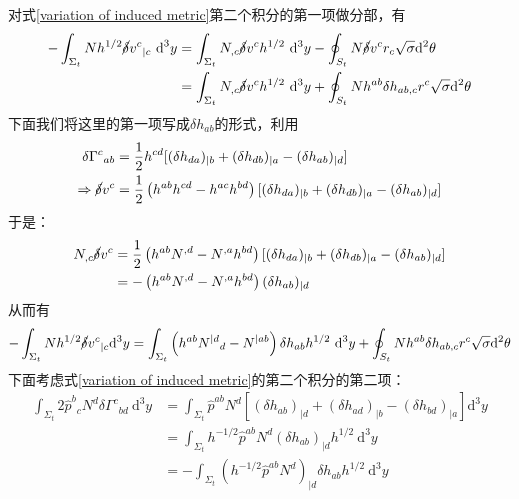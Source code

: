 \documentclass[hyperref, UTF8, a4paper]{ctexart}
\begin{document}
对式\ref{variation of induced metric}第二个积分的第一项做分部，有
\begin{equation*}
	\begin{aligned}
		-\int _{\Sigma _{t}} Nh^{1/2}\cancel{\delta } v^{c}{}_{|c}\mathrm{\ d}^{3} y & =\int _{\Sigma _{t}} N_{,c}\cancel{\delta } v^{c} h^{1/2} \ \mathrm{d}^{3} y-\oint _{S_{t}} N\cancel{\delta } v^{c} r_{c}\sqrt{\sigma }\mathrm{d}^{2} \theta \\
		& =\int _{\Sigma _{t}} N_{,c}\cancel{\delta } v^{c} h^{1/2} \ \mathrm{d}^{3} y+\oint _{S_{t}} Nh^{ab} \delta h_{ab,c} r^{c}\sqrt{\sigma }\mathrm{d}^{2} \theta 
	\end{aligned}
\end{equation*}
下面我们将这里的第一项写成$\delta h_{ab}$的形式，利用
\begin{equation*}
	\begin{aligned}
		\delta \Gamma ^{c}{}_{ab} & =\frac{1}{2} h^{cd}[( \delta h_{da})_{\mid b} +( \delta h_{db})_{\mid a} -( \delta h_{ab})_{\mid d}]\\
		\Rightarrow \cancel{\delta } v^{c} & =\frac{1}{2}\left( h^{ab} h^{cd} -h^{ac} h^{bd}\right)[( \delta h_{da})_{\mid b} +( \delta h_{db})_{\mid a} -( \delta h_{ab})_{\mid d}]
	\end{aligned}
\end{equation*}
于是：
\begin{equation*}
	\begin{aligned}
		N_{,c}\cancel{\delta } v^{c} & =\frac{1}{2}\left( h^{ab} N^{,d} -N^{,a} h^{bd}\right)[( \delta h_{da})_{\mid b} +( \delta h_{db})_{\mid a} -( \delta h_{ab})_{\mid d}]\\
		& =-\left( h^{ab} N^{,d} -N^{,a} h^{bd}\right)( \delta h_{ab})_{\mid d}
	\end{aligned}
\end{equation*}
从而有
\begin{equation*}
	-\int _{\Sigma _{t}} Nh^{1/2}\cancel{\delta } v^{c}{}_{|c}\mathrm{d}^{3} y=\int _{\Sigma _{t}}\left( h^{ab} N^{\mid d}{}_{d} -N^{\mid ab}\right) \delta h_{ab} h^{1/2} \ \mathrm{d}^{3} y+\oint _{S_{t}} Nh^{ab} \delta h_{ab,c} r^{c}\sqrt{\sigma }\mathrm{d}^{2} \theta 
\end{equation*}
下面考虑式\ref{variation of induced metric}的第二个积分的第二项：
\begin{equation*}
	\begin{aligned}
		\int _{\Sigma _{t}} 2\hat{p}^{b}{}_{c} N^{d} \delta \Gamma ^{c}{}_{bd} \ \mathrm{d}^{3} y & =\int _{\Sigma _{t}}\hat{p}^{ab} N^{d}[( \delta h_{ab})_{\mid d} +( \delta h_{ad})_{\mid b} -( \delta h_{bd})_{\mid a}]\mathrm{d}^{3} y\\
		& =\int _{\Sigma _{t}} h^{-1/2}\hat{p}^{ab} N^{d}( \delta h_{ab})_{\mid d} h^{1/2} \ \mathrm{d}^{3} y\\
		& =-\int _{\Sigma _{t}} (h^{-1/2}\hat{p}^{ab} N^{d} )_{\mid d} \delta h_{ab} h^{1/2} \ \mathrm{d}^{3} y
	\end{aligned}
\end{equation*}
\end{document}
